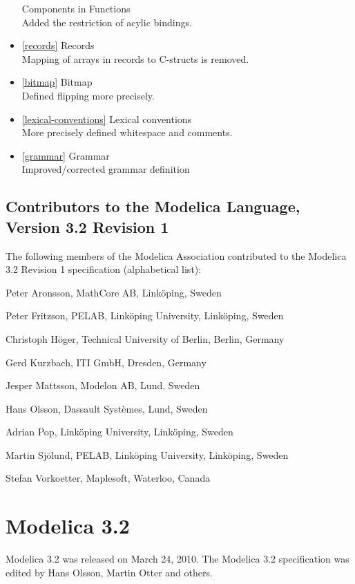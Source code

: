 \begin{itemize}
  Components in Functions\\
  Added the restriction of acylic bindings.
\item
  \autoref{records} Records\\
  Mapping of arrays in records to C-structs is removed.
\item
  \autoref{bitmap} Bitmap\\
  Defined flipping more precisely.
\item
  \autoref{lexical-conventions} Lexical conventions\\
  More precisely defined whitespace and comments.
\item
  \autoref{grammar} Grammar\\
  Improved/corrected grammar definition
\end{itemize}

\subsection{Contributors to the Modelica Language, Version 3.2 Revision 1}

The following members of the Modelica Association contributed to the
Modelica 3.2 Revision 1 specification (alphabetical list):

Peter Aronsson, MathCore AB, Linköping, Sweden

Peter Fritzson, PELAB, Linköping University, Linköping, Sweden

Christoph Höger, Technical University of Berlin, Berlin, Germany

Gerd Kurzbach, ITI GmbH, Dresden, Germany

Jesper Mattsson, Modelon AB, Lund, Sweden

Hans Olsson, Dassault Systèmes, Lund, Sweden

Adrian Pop, Linköping University, Linköping, Sweden

Martin Sjölund, PELAB, Linköping University, Linköping, Sweden

Stefan Vorkoetter, Maplesoft, Waterloo, Canada

\section{Modelica 3.2}

Modelica 3.2 was released on March 24, 2010. The Modelica 3.2
specification was edited by Hans Olsson, Martin Otter and others.

